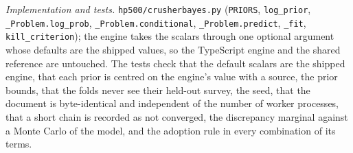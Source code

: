 \emph{Implementation and tests.} \texttt{hp500/\allowbreak{}crusherbayes.py} (\texttt{PRIORS}, \texttt{log\_prior}, \texttt{\_Problem.log\_prob},
\texttt{\_Problem.conditional}, \texttt{\_Problem.predict}, \texttt{\_fit}, \texttt{kill\_criterion}); the engine takes the scalars through one optional
argument whose defaults are the shipped values, so the TypeScript engine and the shared reference are untouched. The tests check that the default
scalars are the shipped engine, that each prior is centred on the engine's value with a source, the prior bounds, that the folds never see their
held-out survey, the seed, that the document is byte-identical and independent of the number of worker processes, that a short chain is recorded as
not converged, the discrepancy marginal against a Monte Carlo of the model, and the adoption rule in every combination of its terms.

\begin{table}[!t]
\centering
\caption{Priors of the eight CrusherBayes engine scalars: truncated normal around the engine's own value, on the scale shown, with the truncation on
that scale. Nominal values are those of the source calibration and the itabirite blend; widths are the author's. Generated from
\texttt{crusherbayes.json}.}
\label{tab:priors}
\footnotesize

\end{table}
